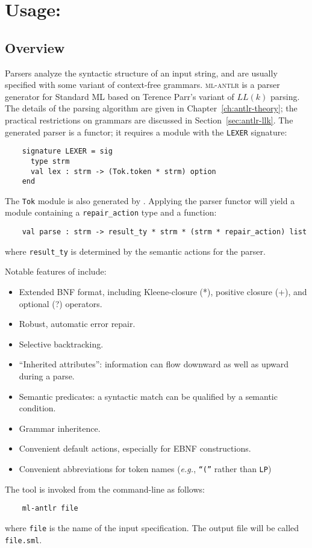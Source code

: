 \chapter[\mlantlr]{Usage: \mlantlr}

\section{Overview}

Parsers analyze the syntactic structure of an input string, and are usually specified with some variant of context-free grammars.  \textsc{ml-antlr} is a parser generator for Standard ML based on Terence Parr's variant of $LL(k)$ parsing.  The details of the parsing algorithm are given in Chapter~\ref{ch:antlr-theory}; the practical restrictions on grammars are discussed in Section~\ref{sec:antlr-llk}.  The generated parser is a functor; it requires a module with the {\tt LEXER} signature:
\begin{verbatim}
    signature LEXER = sig
      type strm
      val lex : strm -> (Tok.token * strm) option
    end
\end{verbatim}
The {\tt Tok} module is also generated by \antlr{}.  Applying the parser functor will yield a module containing a {\tt repair\_action} type and a function:
\begin{verbatim}
    val parse : strm -> result_ty * strm * (strm * repair_action) list
\end{verbatim}
where {\tt result\_ty} is determined by the semantic actions for the parser.  

Notable features of \antlr{} include:
\begin{itemize}
 \item Extended BNF format, including Kleene-closure (*), positive closure (+), and optional (?) operators.
 \item Robust, automatic error repair.
 \item Selective backtracking.
 \item ``Inherited attributes'': information can flow downward as well as upward during a parse.
 \item Semantic predicates: a syntactic match can be qualified by a semantic condition.
 \item Grammar inheritence.
 \item Convenient default actions, especially for EBNF constructions.
 \item Convenient abbreviations for token names (\emph{e{.}g{.}}, {\tt ``(''} rather than {\tt LP})
\end{itemize}
The tool is invoked from the command-line as follows:
\begin{verbatim}
    ml-antlr file
\end{verbatim}
where {\tt file} is the name of the input \ulex{} specification.
The output file will be called {\tt file.sml}.

